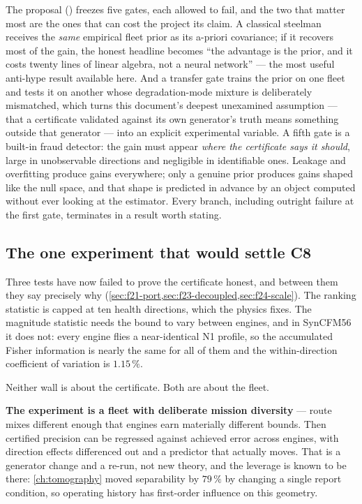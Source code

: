 The proposal () freezes five gates, each allowed to fail, and the
two that matter most are the ones that can cost the project its claim. A classical steelman
receives the \emph{same} empirical fleet prior as its a-priori covariance; if it recovers most
of the gain, the honest headline becomes ``the advantage is the prior, and it costs twenty
lines of linear algebra, not a neural network'' --- the most useful anti-hype result available
here. And a transfer gate trains the prior on one fleet and tests it on another whose
degradation-mode mixture is deliberately mismatched, which turns this document's deepest
unexamined assumption --- that a certificate validated against its own generator's truth means
something outside that generator --- into an explicit experimental variable. A fifth gate is a
built-in fraud detector: the gain must appear \emph{where the certificate says it should},
large in unobservable directions and negligible in identifiable ones. Leakage and overfitting
produce gains everywhere; only a genuine prior produces gains shaped like the null space, and
that shape is predicted in advance by an object computed without ever looking at the
estimator. Every branch, including outright failure at the first gate, terminates in a result
worth stating.

\subsection{The one experiment that would settle C8}
\label{sec:future-c8}

Three tests have now failed to prove the certificate honest, and between them they say
precisely why (\cref{sec:f21-port,sec:f23-decoupled,sec:f24-scale}). The ranking statistic is
capped at ten health directions, which the physics fixes. The magnitude statistic needs the
bound to vary between engines, and in SynCFM56 it does not: every engine flies a near-identical
N1 profile, so the accumulated Fisher information is nearly the same for all of them and the
within-direction coefficient of variation is $1.15\,\%$.

Neither wall is about the certificate. Both are about the fleet.

\textbf{The experiment is a fleet with deliberate mission diversity} --- route mixes different
enough that engines earn materially different bounds. Then certified precision can be regressed
against achieved error across engines, with direction effects differenced out and a predictor
that actually moves. That is a generator change and a re-run, not new theory, and the leverage
is known to be there: \cref{ch:tomography} moved separability by $79\,\%$ by changing a single
report condition, so operating history has first-order influence on this geometry.


